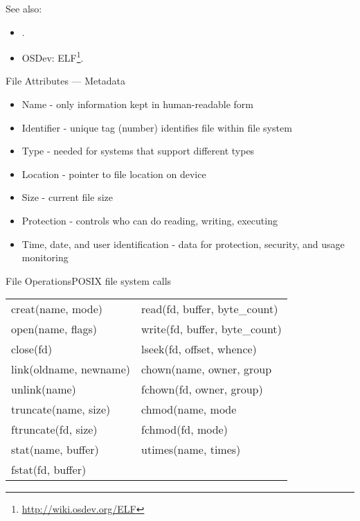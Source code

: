 See also:
\begin{itemize}
\item {}.
\item OSDev: ELF\footnote{\url{http://wiki.osdev.org/ELF}}.
\end{itemize}

\begin{frame}{File Attributes --- Metadata}
  \begin{itemize}
  \item \alert{Name} - only information kept in human-readable form
  \item \alert{Identifier} - unique tag (number) identifies file within file system
  \item \alert{Type} - needed for systems that support different types
  \item \alert{Location} - pointer to file location on device
  \item \alert{Size} - current file size
  \item \alert{Protection} - controls who can do reading, writing, executing
  \item \alert{Time, date, and user identification} - data for protection, security, and
    usage monitoring
  \end{itemize}
\end{frame}

\begin{frame}{File Operations}{POSIX file system calls}%
  \ttfamily
  \begin{tabular}{l|l}
    creat(name, mode)&read(fd, buffer, byte\_count)\\
    open(name, flags)&write(fd, buffer, byte\_count)\\
    close(fd)&lseek(fd, offset, whence)\\
    link(oldname, newname)&chown(name, owner, group\\
    unlink(name)&fchown(fd, owner, group)\\        
    truncate(name, size)&chmod(name, mode\\
    ftruncate(fd, size)&fchmod(fd, mode)\\
    stat(name, buffer)&utimes(name, times)\\
    fstat(fd, buffer)&\\
  \end{tabular}
\end{frame}

